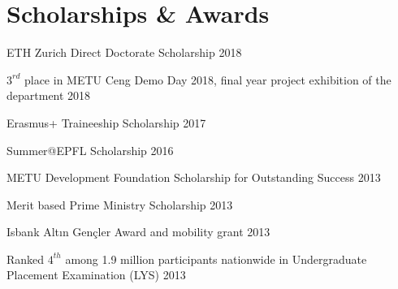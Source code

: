 \section{Scholarships \& Awards}

\begin{denseouterlist}

\item ETH Zurich Direct Doctorate Scholarship \hfill 2018

\item $3^{rd}$ place in METU Ceng Demo Day 2018, final year project exhibition of the department \hfill 2018

\item Erasmus+ Traineeship Scholarship \hfill 2017

\item Summer@EPFL Scholarship \hfill 2016

\item METU Development Foundation Scholarship for Outstanding Success \hfill 2013

\item Merit based Prime Ministry Scholarship \hfill 2013

\item Isbank Altın Gençler Award and mobility grant \hfill 2013

\item Ranked $4^{th}$ among 1.9 million participants nationwide in Undergraduate Placement Examination (LYS) \hfill 2013

\end{denseouterlist}
